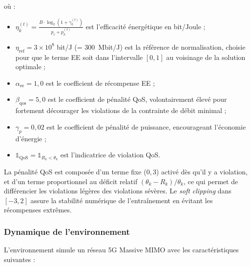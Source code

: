 \documentclass[conference]{IEEEtran}
\begin{document}
où :
\begin{itemize}
    \item $\eta_k^{(t)} = \frac{B \cdot \log_2(1 + \gamma_k^{(t)})}{p_c + p_k^{(t)}}$ est l'efficacité énergétique en bit/Joule ;
    \item $\eta_{\text{ref}} = 3 \times 10^8$ bit/J (= 300~Mbit/J) est la référence de normalisation, choisie pour que le terme EE soit dans l'intervalle $[0, 1]$ au voisinage de la solution optimale ;
    \item $\alpha_{\text{ee}} = 1{,}0$ est le coefficient de récompense EE ;
    \item $\beta_{\text{qos}} = 5{,}0$ est le coefficient de pénalité QoS, volontairement élevé pour fortement décourager les violations de la contrainte de débit minimal ;
    \item $\gamma_p = 0{,}02$ est le coefficient de pénalité de puissance, encourageant l'économie d'énergie ;
    \item $\mathbb{1}_{\text{QoS}} = \mathbb{1}_{R_k < \theta_k}$ est l'indicatrice de violation QoS.
\end{itemize}

La pénalité QoS est composée d'un terme fixe ($0{,}3$) activé dès qu'il y a violation, et d'un terme proportionnel au déficit relatif $(\theta_k - R_k)/\theta_k$, ce qui permet de différencier les violations légères des violations sévères. Le \textit{soft clipping} dans $[-3, 2]$ assure la stabilité numérique de l'entraînement en évitant les récompenses extrêmes.

\subsubsection{Dynamique de l'environnement}
\label{sec:env_dynamics}

L'environnement simule un réseau 5G Massive MIMO avec les caractéristiques suivantes :
\end{document}
